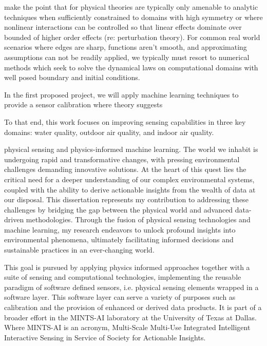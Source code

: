 make the point that for physical theories are typically only amenable to analytic techniques when sufficiently constrained to domains with high symmetry or where nonlinear interactions can be controlled so that linear effects dominate over bounded of higher order effects (re: perturbation theory). For common real world scenarios where edges are sharp, functions aren't smooth, and approximating assumptions can not be readily applied, we typically must resort to numerical methods which seek to solve the dynamical laws on computational domains with well posed boundary and initial conditions.

In the first proposed project, we will apply machine learning techniques to provide a sensor calibration where theory suggests


To that end, this work focuses on improving sensing capabilities in three key domains: water quality, outdoor air quality, and indoor air quality.





physical sensing and physics-informed machine learning. The world we inhabit is undergoing rapid and transformative changes, with pressing environmental challenges demanding innovative solutions. At the heart of this quest lies the critical need for a deeper understanding of our complex environmental systems, coupled with the ability to derive actionable insights from the wealth of data at our disposal. This dissertation represents my contribution to addressing these challenges by bridging the gap between the physical world and advanced data-driven methodologies. Through the fusion of physical sensing technologies and machine learning, my research endeavors to unlock profound insights into environmental phenomena, ultimately facilitating informed decisions and sustainable practices in an ever-changing world.



This goal is pursued by applying physics informed approaches together with a suite of sensing and computational technologies, implementing the reusable paradigm of software defined sensors, i.e. physical sensing elements wrapped in a software layer. This software layer can serve a variety of purposes such as calibration and the provision of enhanced or derived data products. It is part of a broader effort in the MINTS-AI laboratory at the University of Texas at Dallas. Where MINTS-AI is an acronym, Multi-Scale Multi-Use Integrated Intelligent Interactive Sensing in Service of Society for Actionable Insights.

